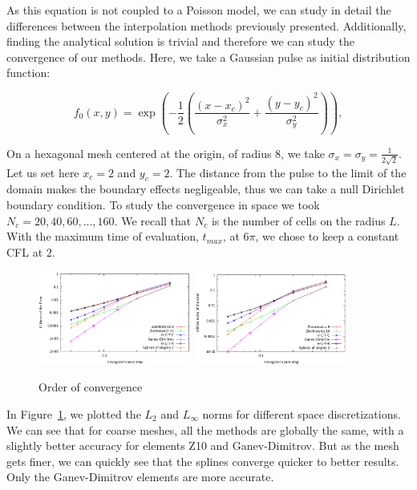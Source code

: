\documentclass[proc]{edpsmath}
\newcommand{\blue}[1]{\textcolor{blue}{#1}}
\begin{document}
As this equation is not coupled to a Poisson model, we can study in detail the differences between the interpolation methods previously presented.	Additionally, finding the analytical solution is trivial and therefore we can study the convergence of our methods. Here, we take a Gaussian pulse as initial distribution function:

	\begin{equation}
	 f_0(x,y) = \exp  \left( -\dfrac{1}{2} \left( \dfrac{(x - x_c)^2}{\sigma_x^2} + \dfrac{(y - y_c)^2}{\sigma_y^2  } \right)   \right ), 
	\end{equation}

On a hexagonal mesh centered at the origin, of radius $8$,  we take  $\sigma_x = \sigma_y = \frac{1}{2\sqrt{2}}$. Let us set here $x_c = 2$ and $y_c = 2$. The distance from the pulse to the limit of the domain makes the boundary effects negligeable, thus we can take a null Dirichlet boundary condition.  To study the convergence in space we took $N_c = 20, 40, 60, ..., 160$. We recall that $N_c$ is the number of cells on the radius $L$. With the maximum time of evaluation, $t_{max}$, at $6 \pi$, we chose to keep a constant CFL at $2$.



\begin{figure}[h!]
	\includegraphics[width=0.45\textwidth]{figures/l2.png}
	\includegraphics[width=0.45\textwidth]{figures/inf_l.png}
	\caption{Order of convergence}
	\label{fig:circ_convergence}
\end{figure}


In Figure~\ref{fig:circ_convergence}, we plotted the $L_2$ and $L_\infty$ norms for different space discretizations. We can see that for coarse meshes, all the methods are globally the same, with a slightly better accuracy for elements Z10 and Ganev-Dimitrov. But as the mesh gets finer, we can quickly see that the splines converge quicker to better results. Only the Ganev-Dimitrov elements are more accurate. 
\end{document}
